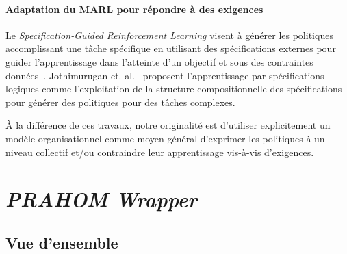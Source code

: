 \documentclass[demonstration]{jfsma}
\newcommand{\jp}[1]{\textbf{\color{red} JPJ: #1}}
\begin{document}
\paragraph{\textbf{Adaptation du MARL pour répondre à des exigences}}
%
%
Le \emph{Specification-Guided Reinforcement Learning} visent à générer les politiques accomplissant une tâche spécifique en utilisant des spécifications externes pour guider l'apprentissage dans l'atteinte d'un objectif et sous des contraintes données~\cite{Bansal2022}.%
%
%
%
Jothimurugan et. al.~\cite{Jothimurugan2021} proposent l'apprentissage par spécifications logiques comme l'exploitation de la structure compositionnelle des spécifications pour générer des politiques pour des tâches complexes.

À la différence de ces travaux, notre originalité est d'utiliser explicitement un modèle organisationnel comme moyen général d'exprimer les politiques à un niveau collectif et/ou contraindre leur apprentissage vis-à-vis d'exigences.




\section{\emph{PRAHOM Wrapper}}

\subsection{Vue d'ensemble}
\end{document}
